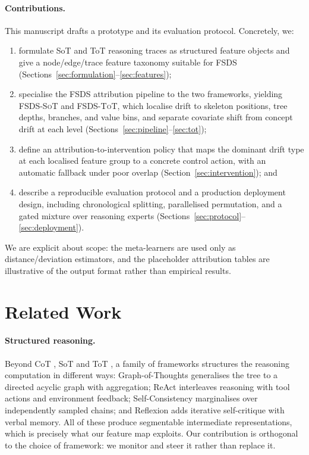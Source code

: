 \documentclass[11pt]{article}
\begin{document}
\paragraph{Contributions.} This manuscript drafts a prototype and its evaluation
protocol. Concretely, we:
\begin{enumerate}[leftmargin=*,itemsep=2pt]
  \item formulate SoT and ToT reasoning traces as structured feature objects and
  give a node/edge/trace feature taxonomy suitable for FSDS
  (Sections~\ref{sec:formulation}--\ref{sec:features});
  \item specialise the FSDS attribution pipeline to the two frameworks, yielding
  \textsc{FSDS-SoT} and \textsc{FSDS-ToT}, which localise drift to skeleton
  positions, tree depths, branches, and value bins, and separate covariate shift
  from concept drift at each level (Sections~\ref{sec:pipeline}--\ref{sec:tot});
  \item define an attribution-to-intervention policy that maps the dominant drift
  type at each localised feature group to a concrete control action, with an
  automatic fallback under poor overlap (Section~\ref{sec:intervention}); and
  \item describe a reproducible evaluation protocol and a production deployment
  design, including chronological splitting, parallelised permutation, and a
  gated mixture over reasoning experts
  (Sections~\ref{sec:protocol}--\ref{sec:deployment}).
\end{enumerate}
We are explicit about scope: the meta-learners are used only as
distance/deviation estimators, and the placeholder attribution tables are
illustrative of the output format rather than empirical results.

\section{Related Work}
\label{sec:related}

\paragraph{Structured reasoning.} Beyond CoT \cite{wei2022cot}, SoT
\cite{ning2024sot} and ToT \cite{yao2023tot}, a family of frameworks structures
the reasoning computation in different ways: Graph-of-Thoughts
\cite{besta2024got} generalises the tree to a directed acyclic graph with
aggregation; ReAct \cite{yao2023react} interleaves reasoning with tool actions
and environment feedback; Self-Consistency \cite{wang2023selfconsistency}
marginalises over independently sampled chains; and Reflexion
\cite{shinn2023reflexion} adds iterative self-critique with verbal memory. All of
these produce segmentable intermediate representations, which is precisely what
our feature map exploits. Our contribution is orthogonal to the choice of
framework: we monitor and steer it rather than replace it.
\end{document}
